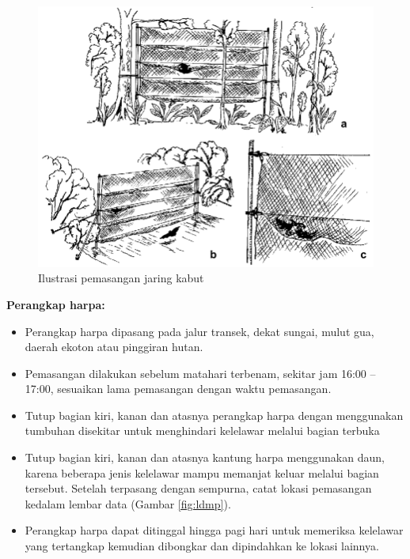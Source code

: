 \documentclass[
]{book}
\providecommand{\tightlist}{%
  \setlength{\itemsep}{0pt}\setlength{\parskip}{0pt}}
\begin{document}
\begin{figure}

{\centering \includegraphics[width=1\linewidth]{images/mistnetuses} 

}

\caption{Ilustrasi pemasangan jaring kabut}\label{fig:mistnet}
\end{figure}

\textbf{Perangkap harpa:}

\begin{itemize}
\tightlist
\item
  Perangkap harpa dipasang pada jalur transek, dekat sungai, mulut gua, daerah ekoton atau pinggiran hutan.
\item
  Pemasangan dilakukan sebelum matahari terbenam, sekitar jam 16:00 -- 17:00, sesuaikan lama pemasangan dengan waktu pemasangan.
\item
  Tutup bagian kiri, kanan dan atasnya perangkap harpa dengan menggunakan tumbuhan disekitar untuk menghindari kelelawar melalui bagian terbuka
\item
  Tutup bagian kiri, kanan dan atasnya kantung harpa menggunakan daun, karena beberapa jenis kelelawar mampu memanjat keluar melalui bagian tersebut. Setelah terpasang dengan sempurna, catat lokasi pemasangan kedalam lembar data (Gambar \ref{fig:ldmp}).
\item
  Perangkap harpa dapat ditinggal hingga pagi hari untuk memeriksa kelelawar yang tertangkap kemudian dibongkar dan dipindahkan ke lokasi lainnya.
\end{itemize}
\end{document}
